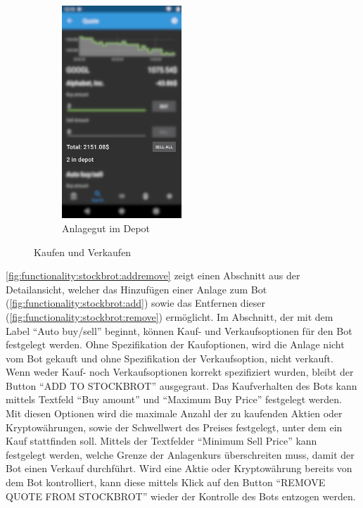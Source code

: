 \documentclass[a4paper]{article}
\begin{document}
\begin{figure}[H]
\begin{subfigure}{.5\textwidth}
		\centering
		\includegraphics[height=8cm,keepaspectratio]{./images/quote/in_depot.png}
		\caption{Anlagegut im Depot}
		\label{fig:functionality:buy-sell:in-depot}
	\end{subfigure}
	\caption{Kaufen und Verkaufen}
	\label{fig:functionality:buy-sell}
\end{figure}

\autoref{fig:functionality:stockbrot:addremove} zeigt einen Abschnitt aus der Detailansicht, welcher das Hinzufügen einer Anlage zum Bot (\autoref{fig:functionality:stockbrot:add}) sowie das Entfernen dieser (\autoref{fig:functionality:stockbrot:remove}) ermöglicht. Im Abschnitt, der mit dem Label "`Auto buy/sell"' beginnt, können Kauf- und Verkaufsoptionen für den Bot festgelegt werden. Ohne Spezifikation der Kaufoptionen, wird die Anlage nicht vom Bot gekauft und ohne Spezifikation der Verkaufsoption, nicht verkauft. Wenn weder Kauf- noch Verkaufsoptionen korrekt spezifiziert wurden, bleibt der Button "`ADD TO STOCKBROT"' ausgegraut. Das Kaufverhalten des Bots kann mittels Textfeld "`Buy amount"' und "`Maximum Buy Price"' festgelegt werden. Mit diesen Optionen wird die maximale Anzahl der zu kaufenden Aktien oder Kryptowährungen, sowie der Schwellwert des Preises festgelegt, unter dem ein Kauf stattfinden soll. Mittels der Textfelder "`Minimum Sell Price"' kann festgelegt werden, welche Grenze der Anlagenkurs überschreiten muss, damit der Bot einen Verkauf durchführt. Wird eine Aktie oder Kryptowährung bereits von dem Bot kontrolliert, kann diese mittels Klick auf den Button "`REMOVE QUOTE FROM STOCKBROT"' wieder der Kontrolle des Bots entzogen werden.
\end{document}
